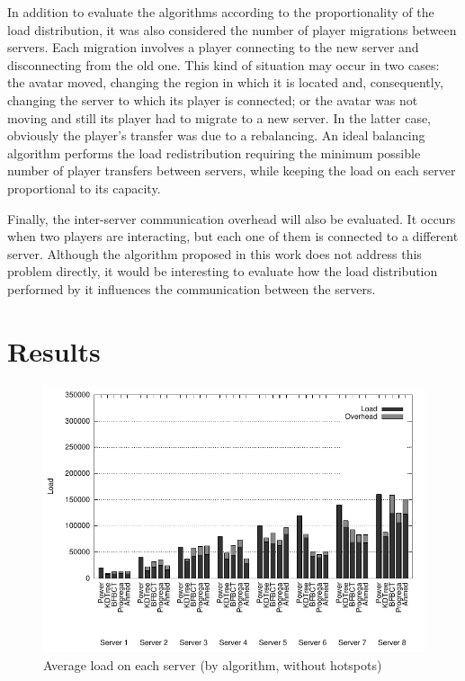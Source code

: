 \documentclass[acmjacm]{acmtrans2m}
\begin{document}
In addition to evaluate the algorithms according to the proportionality of the load distribution, it was also considered the number of player migrations between servers. Each migration involves a player connecting to the new server and disconnecting from the old one. This kind of situation may occur in two cases: the avatar moved, changing the region in which it is located and, consequently, changing the server to which its player is connected; or the avatar was not moving and still its player had to migrate to a new server. In the latter case, obviously the player's transfer was due to a rebalancing. An ideal balancing algorithm performs the load redistribution requiring the minimum possible number of player transfers between servers, while keeping the load on each server proportional to its capacity.

Finally, the inter-server communication overhead will also be evaluated. It occurs when two players are interacting, but each one of them is connected to a different server. Although the algorithm proposed in this work does not address this problem directly, it would be interesting to evaluate how the load distribution performed by it influences the communication between the servers.

\section{Results}
\label{sec:result}

\begin{figure}[!t]
	\centering
	\includegraphics[width=\linewidth]{images/distribution_uniform}
	\caption{Average load on each server (by algorithm, without hotspots)}
	\label{fig:distribution:uniform}
\end{figure}
\end{document}

